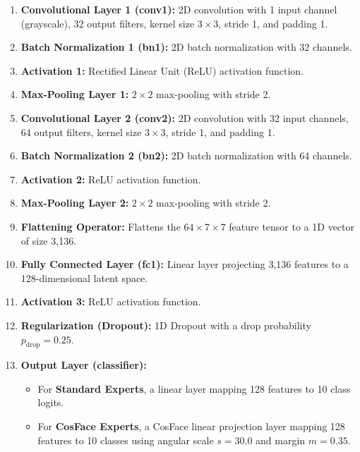 \documentclass{article}
\theoremstyle{plain}
\theoremstyle{definition}
\theoremstyle{remark}
\begin{document}
\begin{enumerate}
    \item \textbf{Convolutional Layer 1 (conv1):} 2D convolution with 1 input channel (grayscale), 32 output filters, kernel size $3 \times 3$, stride 1, and padding 1.
    \item \textbf{Batch Normalization 1 (bn1):} 2D batch normalization with 32 channels.
    \item \textbf{Activation 1:} Rectified Linear Unit (ReLU) activation function.
    \item \textbf{Max-Pooling Layer 1:} $2 \times 2$ max-pooling with stride 2.
    \item \textbf{Convolutional Layer 2 (conv2):} 2D convolution with 32 input channels, 64 output filters, kernel size $3 \times 3$, stride 1, and padding 1.
    \item \textbf{Batch Normalization 2 (bn2):} 2D batch normalization with 64 channels.
    \item \textbf{Activation 2:} ReLU activation function.
    \item \textbf{Max-Pooling Layer 2:} $2 \times 2$ max-pooling with stride 2.
    \item \textbf{Flattening Operator:} Flattens the $64 \times 7 \times 7$ feature tensor to a 1D vector of size 3,136.
    \item \textbf{Fully Connected Layer (fc1):} Linear layer projecting 3,136 features to a 128-dimensional latent space.
    \item \textbf{Activation 3:} ReLU activation function.
    \item \textbf{Regularization (Dropout):} 1D Dropout with a drop probability $p_{\text{drop}} = 0.25$.
    \item \textbf{Output Layer (classifier):}
    \begin{itemize}
        \item For \textbf{Standard Experts}, a linear layer mapping 128 features to 10 class logits.
        \item For \textbf{CosFace Experts}, a CosFace linear projection layer mapping 128 features to 10 classes using angular scale $s = 30.0$ and margin $m = 0.35$.
    \end{itemize}
\end{enumerate}
\end{document}
